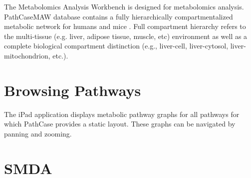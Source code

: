 The Metabolomics Analysis Workbench is designed for metabolomics analysis.
PathCaseMAW database contains a fully hierarchically compartmentalized metabolic
network for humans and mice \cite{pathcase-basic}. Full compartment hierarchy
refers to the multi-tissue (e.g.  liver, adipose tissue, muscle, etc)
environment as well as a complete biological compartment distinction (e.g.,
liver-cell, liver-cytosol, liver-mitochondrion, etc.).

\section{Browsing Pathways}

The iPad application displays metabolic pathway graphs for all pathways for
which PathCase provides a static layout. These graphs can be navigated by
panning and zooming.





\section{SMDA}







